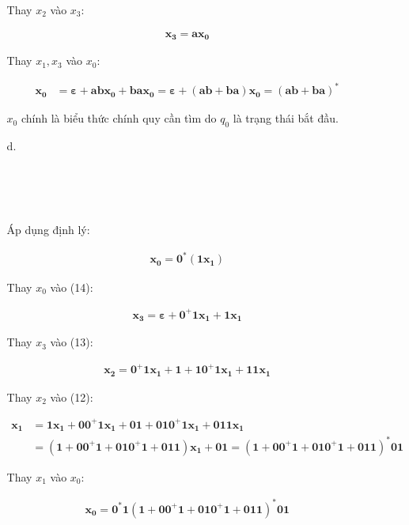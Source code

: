 \documentclass[12pt, a4paper]{article}
\begin{document}
\begin{itemize}
\begin{itemize}
				Thay $x_2$ vào $x_3$:
				
				\begin{align*}
				\bm{ x_3 = ax_0 }
				\end{align*}
				
				Thay $x_1, x_3$ vào $x_0$:
				
				\begin{align*}
				\bm{ x_0 } &= \bm{ \varepsilon + abx_0 + bax_0 = \varepsilon + (ab + ba)x_0 = (ab + ba)^* }
				\end{align*}
				
				$x_0$ chính là biểu thức chính quy cần tìm do $q_0$ là trạng thái bắt đầu.
				
			\item[d.]
			
				\begin{numcases}{}
				\\
				\\
				\\
				\end{numcases}
				
				Áp dụng định lý:
				
				\begin{align*}
				\bm{ x_0 = 0^*(1x_1) }
				\end{align*}
				
				Thay $x_0$ vào (14):
				
				\begin{align*}
				\bm{ x_3 = \varepsilon + 0^+1x_1 + 1x_1 }
				\end{align*}
				
				Thay $x_3$ vào (13):
				
				\begin{align*}
				\bm{ x_2 = 0^+1x_1 + 1 + 10^+1x_1 + 11x_1 }
				\end{align*}
				
				Thay $x_2$ vào (12):
				
				\begin{align*}
				\bm{ x_1 } &= \bm{ 1x_1 + 00^+1x_1 + 01 + 010^+1x_1 + 011x_1 } \\
				&= \bm{ (1 + 00^+1 + 010^+1 + 011)x_1 + 01     = (1 + 00^+1 + 010^+1 + 011)^*01 }
				\end{align*}
				
				Thay $x_1$ vào $x_0$:
				
				\begin{align*}
				\bm{ x_0 = 0^*1 (1 + 00^+1 + 010^+1 + 011)^*01 }
				\end{align*}
		
		\end{itemize}
	
	\end{itemize}
	
\end{document}
